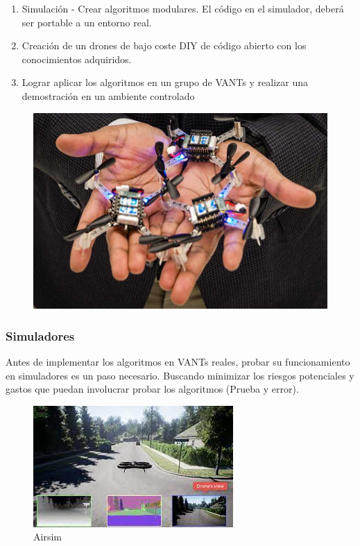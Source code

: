 \documentclass[
	11pt, %
]{beamer}
\begin{document}
\begin{frame}
  
  \begin{enumerate}
  \item Simulación - Crear algoritmos modulares. El código en el simulador, deberá ser portable a un entorno real.
  \item Creación de un drones de bajo coste DIY de código abierto con los conocimientos adquiridos. 
  \item Lograr aplicar los algoritmos en un grupo de VANTs y realizar una demostración en un ambiente controlado
  \end{enumerate}

  \begin{figure}[h]
    \includegraphics[width=0.5\linewidth]{drone_hand.jpg}
  \end{figure}
  
\end{frame}

\begin{frame}
  \frametitle{Simuladores}
  Antes de implementar los algoritmos en VANTs reales, probar su funcionamiento en simuladores es un paso necesario. Buscando minimizar los riesgos potenciales y gastos que puedan involucrar probar los algoritmos (Prueba y error).
  \begin{figure}
    \includegraphics[width=0.5\linewidth]{airsim.jpeg}
    \caption{Airsim}
  \end{figure}
\end{frame}
\end{document}
